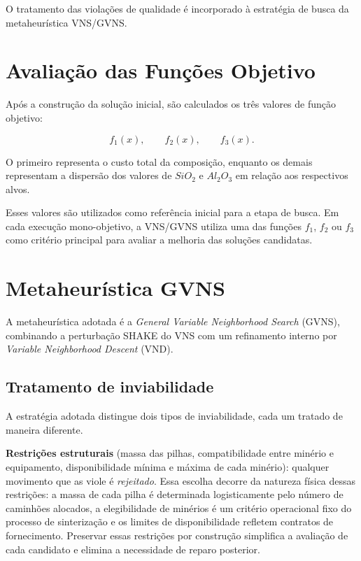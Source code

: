 \documentclass[12pt,a4paper]{article}
\begin{document}
O tratamento das violações de qualidade é incorporado à estratégia
de busca da metaheurística VNS/GVNS.



\section{Avaliação das Funções Objetivo}

Após a construção da solução inicial, são calculados os três valores de
função objetivo:

\begin{equation}
f_1(x),
\qquad
f_2(x),
\qquad
f_3(x).
\end{equation}

O primeiro representa o custo total da composição, enquanto os demais
representam a dispersão dos valores de $SiO_2$ e $Al_2O_3$ em relação
aos respectivos alvos.

Esses valores são utilizados como referência inicial para a etapa de
busca. Em cada execução mono-objetivo, a VNS/GVNS utiliza uma das
funções $f_1$, $f_2$ ou $f_3$ como critério principal para avaliar
a melhoria das soluções candidatas.



\section{Metaheurística GVNS}

A metaheurística adotada é a \textit{General Variable Neighborhood
Search} (GVNS), combinando a perturbação SHAKE do VNS com um refinamento
interno por \textit{Variable Neighborhood Descent} (VND).


\subsection{Tratamento de inviabilidade}

A estratégia adotada distingue dois tipos de inviabilidade, cada um tratado de
maneira diferente.

\textbf{Restrições estruturais} (massa das pilhas, compatibilidade entre minério e
equipamento, disponibilidade mínima e máxima de cada minério): qualquer movimento
que as viole é \emph{rejeitado}. Essa escolha decorre da natureza física dessas restrições:
a massa de cada pilha é determinada logisticamente pelo número de caminhões alocados, a
elegibilidade de minérios é um critério operacional fixo do processo de sinterização e os
limites de disponibilidade refletem contratos de fornecimento. Preservar essas restrições
por construção simplifica a avaliação de cada candidato e elimina a necessidade de reparo
posterior.
\end{document}

